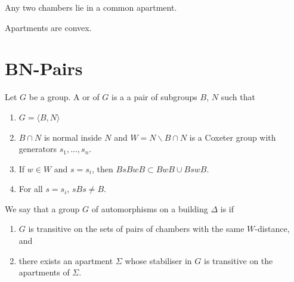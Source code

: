\documentclass[11pt]{article}
\begin{document}
\begin{corollary}
    Any two chambers lie in a common apartment.
\end{corollary}

\begin{theorem}
    Apartments are convex.
\end{theorem}

\section{BN-Pairs}

\begin{definition}
    Let $G$ be a group. A  or  of $G$ is a a pair of subgroups $B$, $N$ such that
    \begin{enumerate}
        \item $G=\langle B,N\rangle$
        \item $B\cap N$ is normal inside $N$ and $W=N\backslash B\cap N$ is a Coxeter group with generators $s_1,...,s_n$.
        \item If $w\in W$ and $s=s_i$, then $BsBwB\subset BwB\cup BswB$.
        \item For all $s=s_i$, $sBs\neq B$. 
    \end{enumerate}
\end{definition}


\begin{definition}
    We say that a group $G$ of automorphisms on a building $\Delta$ is  if 
    \begin{enumerate}
        \item $G$ is transitive on the sets of pairs of chambers with the same $W$-distance, and
        \item there exists an apartment $\Sigma$ whose stabiliser in $G$ is transitive on the apartments of $\Sigma$. 
    \end{enumerate}
\end{definition}

\end{document}
